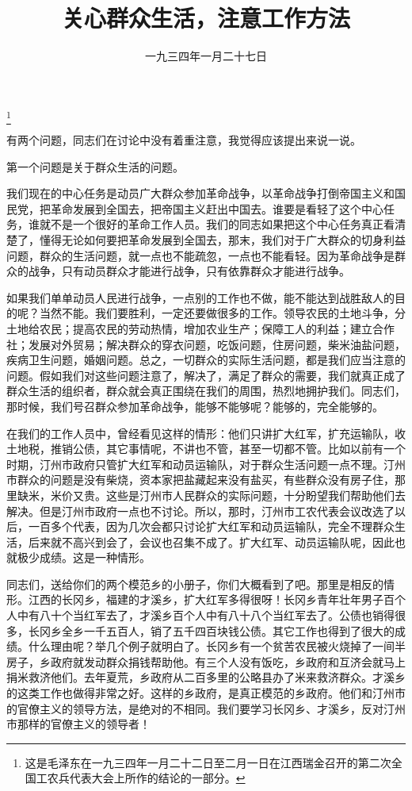 
\title{关心群众生活，注意工作方法}
\date{一九三四年一月二十七日}
\thanks{这是毛泽东在一九三四年一月二十二日至二月一日在江西瑞金召开的第二次全国工农兵代表大会上所作的结论的一部分。}
\maketitle


有两个问题，同志们在讨论中没有着重注意，我觉得应该提出来说一说。

第一个问题是关于群众生活的问题。

我们现在的中心任务是动员广大群众参加革命战争，以革命战争打倒帝国主义和国民党，把革命发展到全国去，把帝国主义赶出中国去。谁要是看轻了这个中心任务，谁就不是一个很好的革命工作人员。我们的同志如果把这个中心任务真正看清楚了，懂得无论如何要把革命发展到全国去，那末，我们对于广大群众的切身利益问题，群众的生活问题，就一点也不能疏忽，一点也不能看轻。因为革命战争是群众的战争，只有动员群众才能进行战争，只有依靠群众才能进行战争。

如果我们单单动员人民进行战争，一点别的工作也不做，能不能达到战胜敌人的目的呢？当然不能。我们要胜利，一定还要做很多的工作。领导农民的土地斗争，分土地给农民；提高农民的劳动热情，增加农业生产；保障工人的利益；建立合作社；发展对外贸易；解决群众的穿衣问题，吃饭问题，住房问题，柴米油盐问题，疾病卫生问题，婚姻问题。总之，一切群众的实际生活问题，都是我们应当注意的问题。假如我们对这些问题注意了，解决了，满足了群众的需要，我们就真正成了群众生活的组织者，群众就会真正围绕在我们的周围，热烈地拥护我们。同志们，那时候，我们号召群众参加革命战争，能够不能够呢？能够的，完全能够的。

在我们的工作人员中，曾经看见这样的情形：他们只讲扩大红军，扩充运输队，收土地税，推销公债，其它事情呢，不讲也不管，甚至一切都不管。比如以前有一个时期，汀州市政府只管扩大红军和动员运输队，对于群众生活问题一点不理。汀州市群众的问题是没有柴烧，资本家把盐藏起来没有盐买，有些群众没有房子住，那里缺米，米价又贵。这些是汀州市人民群众的实际问题，十分盼望我们帮助他们去解决。但是汀州市政府一点也不讨论。所以，那时，汀州市工农代表会议改选了以后，一百多个代表，因为几次会都只讨论扩大红军和动员运输队，完全不理群众生活，后来就不高兴到会了，会议也召集不成了。扩大红军、动员运输队呢，因此也就极少成绩。这是一种情形。

同志们，送给你们的两个模范乡的小册子，你们大概看到了吧。那里是相反的情形。江西的长冈乡，福建的才溪乡，扩大红军多得很呀！长冈乡青年壮年男子百个人中有八十个当红军去了，才溪乡百个人中有八十八个当红军去了。公债也销得很多，长冈乡全乡一千五百人，销了五千四百块钱公债。其它工作也得到了很大的成绩。什么理由呢？举几个例子就明白了。长冈乡有一个贫苦农民被火烧掉了一间半房子，乡政府就发动群众捐钱帮助他。有三个人没有饭吃，乡政府和互济会就马上捐米救济他们。去年夏荒，乡政府从二百多里的公略县办了米来救济群众。才溪乡的这类工作也做得非常之好。这样的乡政府，是真正模范的乡政府。他们和汀州市的官僚主义的领导方法，是绝对的不相同。我们要学习长冈乡、才溪乡，反对汀州市那样的官僚主义的领导者！

